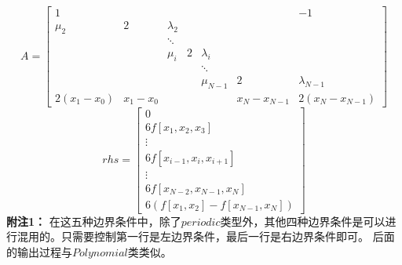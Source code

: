 \documentclass[a4paper]{article}
\begin{document}
\begin{equation*}
A = \left[
\begin{matrix}
        1 & & & & & & -1 \\
        \mu_2 & 2 & \lambda_2 & & & & \\
        & & \ddots & & & & \\
        & & \mu_i & 2 & \lambda_i & & \\
        & & & & \ddots & & \\
        & & & & \mu_{N-1} & 2 & \lambda_{N-1} \\
        2(x_1 - x_0) & x_1 - x_0 & & & & x_N - x_{N-1} & 2(x_N - x_{N-1})
\end{matrix}
\right]
\end{equation*}
\begin{equation*}
rhs = \left[
\begin{matrix}
        0 \\ 6f[x_1,x_2,x_3] \\ \vdots \\
        6f[x_{i-1},x_i,x_{i+1}] \\ \vdots \\ 6f[x_{N-2},x_{N-1},x_N] \\
        6(f[x_1,x_2] - f[x_{N-1},x_N])
\end{matrix}
\right]
\end{equation*}
\textbf{附注1：} 在这五种边界条件中，除了$periodic$类型外，其他四种边界条件是可以进行混用的。只需要控制第一行是左边界条件，最后一行是右边界条件即可。
后面的输出过程与$Polynomial$类类似。
\end{document}
